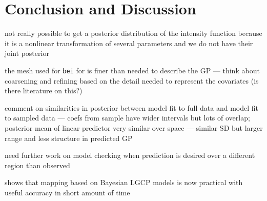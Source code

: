 \documentclass[]{interact}
\begin{document}
\section{Conclusion and Discussion}
\label{conclusion}

not really possible to get a posterior distribution of the intensity function
because it is a nonlinear transformation of several parameters and we do not
have their joint posterior

the mesh used for \texttt{bei} for is finer than needed to describe the
GP --- think about coarsening and refining based on the detail needed to
represent the covariates (is there literature on this?)

comment on similarities in posterior between model fit to full data and model
fit to sampled data --- coefs from sample have wider intervals but lots of
overlap; posterior mean of linear predictor very similar over space ---
similar SD but larger range and less structure in predicted GP

need further work on model checking when prediction is desired over a different
region than observed

shows that mapping based on Bayesian LGCP models is now practical with
useful accuracy in short amount of time





\end{document}
